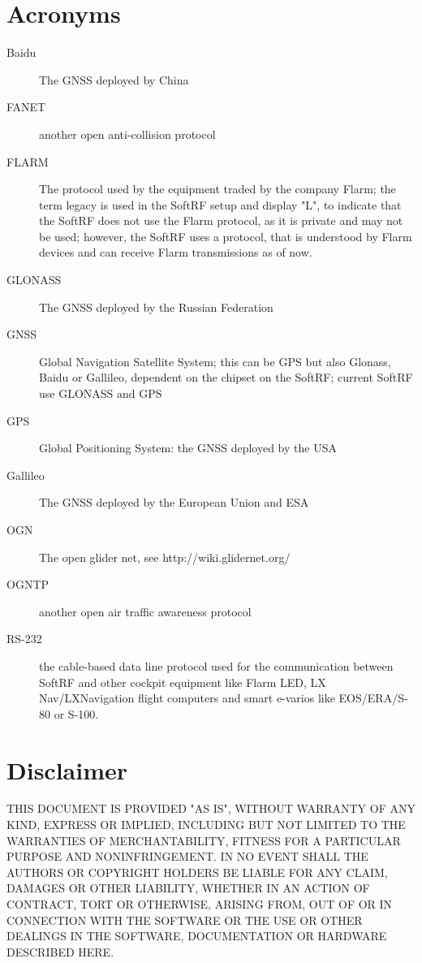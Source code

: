 \documentclass[10pt,a4paper]{article}
\begin{document}
\section{Acronyms}
\begin{description}
\item[Baidu] The GNSS deployed by China
\item[FANET] another open anti-collision protocol
\item[FLARM] The protocol used by the equipment traded by the company Flarm; the term legacy is used in the SoftRF setup and display "L", to indicate that the SoftRF does not use the Flarm protocol, as it is private and may not be used; however, the SoftRF uses a protocol, that is understood by Flarm devices and can receive Flarm transmissions as of now.
\item[GLONASS] The GNSS deployed by the Russian Federation
\item[GNSS] Global Navigation Satellite System; this can be GPS but also Glonass, Baidu or Gallileo, dependent on the chipset on the SoftRF; current SoftRF use GLONASS and GPS
\item[GPS] Global Positioning System: the GNSS deployed by the USA
\item[Gallileo] The GNSS deployed by the European Union and ESA
\item[OGN] The open glider net, see http://wiki.glidernet.org/
\item[OGNTP] another open air traffic awareness protocol
\item[RS-232] the cable-based data line protocol used for the communication between SoftRF and other cockpit equipment like Flarm LED, LX Nav/LXNavigation flight computers and smart e-varios like EOS/ERA/S-80 or S-100.
\end{description}

\section{Disclaimer}
THIS DOCUMENT IS PROVIDED "AS IS", WITHOUT WARRANTY OF ANY KIND, EXPRESS OR IMPLIED, INCLUDING BUT NOT LIMITED TO THE WARRANTIES OF MERCHANTABILITY, FITNESS FOR A PARTICULAR PURPOSE AND NONINFRINGEMENT. IN NO EVENT SHALL THE AUTHORS OR COPYRIGHT HOLDERS BE LIABLE FOR ANY CLAIM, DAMAGES OR OTHER LIABILITY, WHETHER IN AN ACTION OF CONTRACT, TORT OR OTHERWISE, ARISING FROM, OUT OF OR IN CONNECTION WITH THE SOFTWARE OR THE USE OR OTHER DEALINGS IN THE SOFTWARE, DOCUMENTATION OR HARDWARE DESCRIBED HERE.
\end{document}
